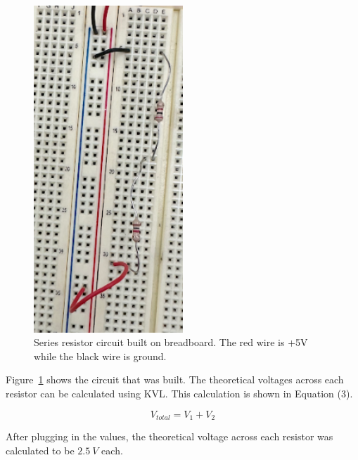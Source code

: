\documentclass{article}
\begin{document}
\begin{figure}[H]
	\centering
	\includegraphics[angle=90,origin=c,width=0.5\textwidth]{built_figure5.png}
	\caption{Series resistor circuit built on breadboard. The red wire is +5V while the black wire is ground.}
	\label{fig:fig6}
\end{figure}

Figure~\ref{fig:fig6} shows the circuit that was built.
The theoretical voltages across each resistor can be calculated using KVL. 
This calculation is shown in Equation (3).

\begin{equation}
    V_{total} = V_1 + V_2
\end{equation}

After plugging in the values, the theoretical voltage across each resistor was
calculated to be $2.5 \: V$ each.
\end{document}
